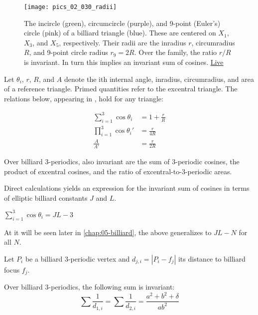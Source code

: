 \begin{figure}
    \centering
    \texttt{[image: pics\_02\_030\_radii]}
    \caption{The incircle (green), circumcircle (purple), and 9-point (Euler's) circle (pink) of a billiard triangle (blue). These are centered on $X_1$, $X_3$, and $X_5$, respectively. Their radii are the inradius $r$, circumradius $R$, and 9-point circle radius $r_9=2R$. Over the family, the ratio $r/R$ is invariant. In turn this implies an invariant sum of cosines. \href{https://bit.ly/337hvpf}{Live}}
    \label{fig:radii}
\end{figure}

Let $\theta_i$, $r$, $R$, and $A$ denote the ith internal angle, inradius, circumradius, and area of a reference triangle. Primed quantities refer to the excentral triangle. The relations below, appearing in  \cite{johnson1960},  hold for any triangle:

\begin{align}
\sum_{i=1}^{3}{\cos\theta_i}&=1+\frac{r}{R} \label{eqn:02-sum-cos} \\
\prod_{i=1}^{3}{\cos\theta_i'}&=\frac{r}{4R} \label{eqn:02-exc-prod-cos} \\
\frac{A}{A'}&=\frac{r}{2R} \label{eqn:02-area-ratio}
\end{align}

\begin{corollary}
Over billiard 3-periodics, also invariant are the sum of 3-periodic cosines, the product of excentral cosines, and the ratio of excentral-to-3-periodic areas.
\label{cor:02-rOvR}
\end{corollary}

Direct calculations yields an expression for the invariant sum of cosines in terms of elliptic billiard constants $J$ and $L$.

\begin{corollary}
$\sum_{i=1}^{3}{\cos\theta_i}=J L - 3$
\end{corollary}

At it will be seen later in \cref{chap:05-billiard}, the above generalizes to $J L -N$ for all $N$.

Let $P_i$ be a billiard 3-periodic vertex and $d_{j,i}=|P_i-f_j|$ its distance to billiard focus $f_j$. 

\begin{proposition}
 Over billiard 3-periodics, the following sum is invariant:
\[  \sum\frac{1}{d_{1,i}}=\sum\frac{1}{d_{2,i}}=\frac {{a}^{2}+{b}^{2}+\delta}{a{b}^{
2}}
\]
\label{prop:02-confocal-inv-spokes}
\end{proposition}

